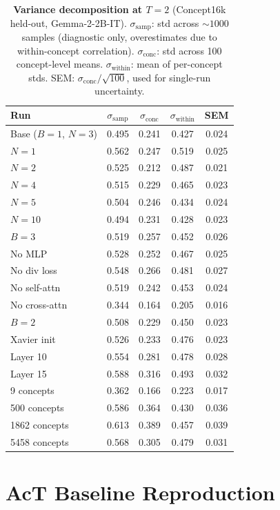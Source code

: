 \documentclass{article}
\begin{document}
\begin{table}[h]
\centering
\caption{\textbf{Variance decomposition at $T\!=\!2$} (Concept16k held-out, Gemma-2-2B-IT). $\sigma_{\text{samp}}$: std across ${\sim}1000$ samples (diagnostic only, overestimates due to within-concept correlation). $\sigma_{\text{conc}}$: std across 100 concept-level means. $\sigma_{\text{within}}$: mean of per-concept stds. SEM: $\sigma_{\text{conc}} / \sqrt{100}$, used for single-run uncertainty.}
\label{tab:variance}
\small
\begin{tabular}{lcccc}
\toprule
\textbf{Run} & $\sigma_{\text{samp}}$ & $\sigma_{\text{conc}}$ & $\sigma_{\text{within}}$ & \textbf{SEM} \\
\midrule
Base ($B\!=\!1$, $N\!=\!3$) & 0.495 & 0.241 & 0.427 & 0.024 \\
\midrule
$N\!=\!1$ & 0.562 & 0.247 & 0.519 & 0.025 \\
$N\!=\!2$ & 0.525 & 0.212 & 0.487 & 0.021 \\
$N\!=\!4$ & 0.515 & 0.229 & 0.465 & 0.023 \\
$N\!=\!5$ & 0.504 & 0.246 & 0.434 & 0.024 \\
$N\!=\!10$ & 0.494 & 0.231 & 0.428 & 0.023 \\
\midrule
$B\!=\!3$ & 0.519 & 0.257 & 0.452 & 0.026 \\
No MLP & 0.528 & 0.252 & 0.467 & 0.025 \\
No div loss & 0.548 & 0.266 & 0.481 & 0.027 \\
No self-attn & 0.519 & 0.242 & 0.453 & 0.024 \\
No cross-attn & 0.344 & 0.164 & 0.205 & 0.016 \\
$B\!=\!2$ & 0.508 & 0.229 & 0.450 & 0.023 \\
Xavier init & 0.526 & 0.233 & 0.476 & 0.023 \\
Layer 10 & 0.554 & 0.281 & 0.478 & 0.028 \\
Layer 15 & 0.588 & 0.316 & 0.493 & 0.032 \\
\midrule
9 concepts & 0.362 & 0.166 & 0.223 & 0.017 \\
500 concepts & 0.586 & 0.364 & 0.430 & 0.036 \\
1862 concepts & 0.613 & 0.389 & 0.457 & 0.039 \\
5458 concepts & 0.568 & 0.305 & 0.479 & 0.031 \\
\bottomrule
\end{tabular}
\end{table}


\section{AcT Baseline Reproduction}
\label{app:act}
\end{document}
